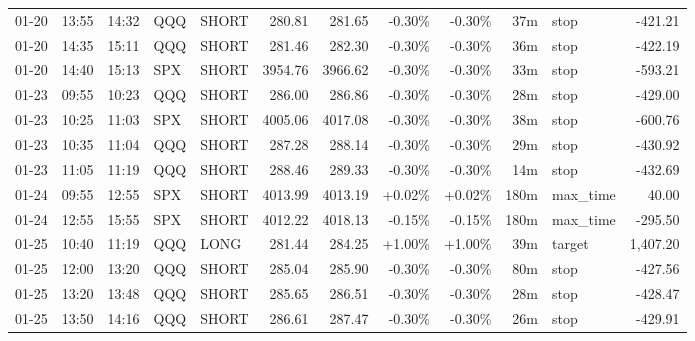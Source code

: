 \documentclass[11pt,a4paper]{article}
\begin{document}
\begin{center}
\begin{longtable}{>{\color{txtmain}}l l l l l r r r r r >{\color{txtmain}}l r}
01-20 & 13:55 & 14:32 & QQQ & SHORT & 280.81 & 281.65 & \textcolor{lossred}{-0.30\%} & \textcolor{lossred}{-0.30\%} & 37m & stop & \textcolor{lossred}{-421.21} \\
01-20 & 14:35 & 15:11 & QQQ & SHORT & 281.46 & 282.30 & \textcolor{lossred}{-0.30\%} & \textcolor{lossred}{-0.30\%} & 36m & stop & \textcolor{lossred}{-422.19} \\
01-20 & 14:40 & 15:13 & SPX & SHORT & 3954.76 & 3966.62 & \textcolor{lossred}{-0.30\%} & \textcolor{lossred}{-0.30\%} & 33m & stop & \textcolor{lossred}{-593.21} \\
01-23 & 09:55 & 10:23 & QQQ & SHORT & 286.00 & 286.86 & \textcolor{lossred}{-0.30\%} & \textcolor{lossred}{-0.30\%} & 28m & stop & \textcolor{lossred}{-429.00} \\
01-23 & 10:25 & 11:03 & SPX & SHORT & 4005.06 & 4017.08 & \textcolor{lossred}{-0.30\%} & \textcolor{lossred}{-0.30\%} & 38m & stop & \textcolor{lossred}{-600.76} \\
01-23 & 10:35 & 11:04 & QQQ & SHORT & 287.28 & 288.14 & \textcolor{lossred}{-0.30\%} & \textcolor{lossred}{-0.30\%} & 29m & stop & \textcolor{lossred}{-430.92} \\
01-23 & 11:05 & 11:19 & QQQ & SHORT & 288.46 & 289.33 & \textcolor{lossred}{-0.30\%} & \textcolor{lossred}{-0.30\%} & 14m & stop & \textcolor{lossred}{-432.69} \\
01-24 & 09:55 & 12:55 & SPX & SHORT & 4013.99 & 4013.19 & \textcolor{wingreen}{+0.02\%} & \textcolor{wingreen}{+0.02\%} & 180m & max\_time & \textcolor{wingreen}{40.00} \\
01-24 & 12:55 & 15:55 & SPX & SHORT & 4012.22 & 4018.13 & \textcolor{lossred}{-0.15\%} & \textcolor{lossred}{-0.15\%} & 180m & max\_time & \textcolor{lossred}{-295.50} \\
01-25 & 10:40 & 11:19 & QQQ & LONG & 281.44 & 284.25 & \textcolor{wingreen}{+1.00\%} & \textcolor{wingreen}{+1.00\%} & 39m & target & \textcolor{wingreen}{1,407.20} \\
01-25 & 12:00 & 13:20 & QQQ & SHORT & 285.04 & 285.90 & \textcolor{lossred}{-0.30\%} & \textcolor{lossred}{-0.30\%} & 80m & stop & \textcolor{lossred}{-427.56} \\
01-25 & 13:20 & 13:48 & QQQ & SHORT & 285.65 & 286.51 & \textcolor{lossred}{-0.30\%} & \textcolor{lossred}{-0.30\%} & 28m & stop & \textcolor{lossred}{-428.47} \\
01-25 & 13:50 & 14:16 & QQQ & SHORT & 286.61 & 287.47 & \textcolor{lossred}{-0.30\%} & \textcolor{lossred}{-0.30\%} & 26m & stop & \textcolor{lossred}{-429.91} \\

\end{longtable}
\end{center}
\end{document}
